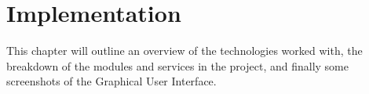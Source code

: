 \chapter{\centering Implementation}

This chapter will outline an overview of the technologies worked with, the breakdown 
of the modules and services in the project, and finally some screenshots of the Graphical 
User Interface.






